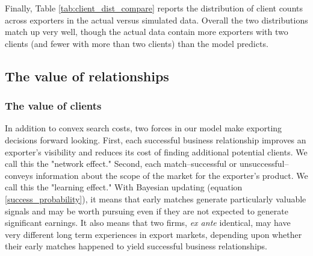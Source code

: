 \documentclass[12pt]{article}
\begin{document}
Finally, Table \ref{tab:client_dist_compare} reports the distribution of
client counts across exporters in the actual versus simulated data. Overall
the two distributions match up very well, though the actual data contain
more exporters with two clients (and fewer with more than two clients) than
the model predicts.

\subsection{The value of relationships}

\subsubsection{The value of clients}

In addition to convex search costs, two forces in our model make exporting
decisions forward looking. First, each successful business relationship
improves an exporter's visibility and reduces its cost of finding additional
potential clients. We call this the "network effect." Second, each
match--successful or unsuccessful--conveys information about the scope of
the market for the exporter's product. We call this the "learning effect."
With Bayesian updating (equation \ref{success_probability}), it means that
early matches generate particularly valuable signals and may be worth
pursuing even if they are not expected to generate significant earnings. It
also means that two firms, \textit{ex ante} identical, may have very
different long term experiences in export markets, depending upon whether
their early matches happened to yield successful business relationships.

\end{document}
